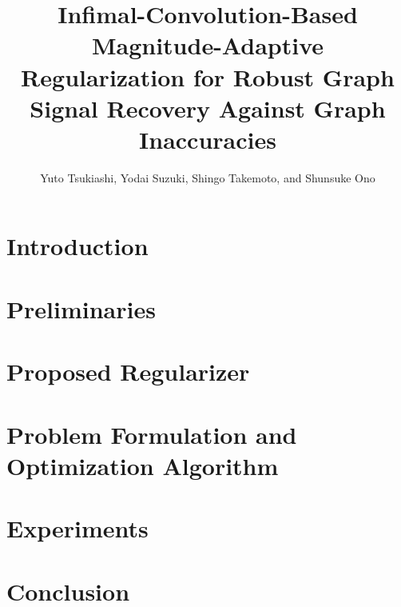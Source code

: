 \documentclass[journal]{IEEEtran}
\begin{document}
\title{Infimal-Convolution-Based Magnitude-Adaptive Regularization for Robust Graph Signal Recovery Against Graph Inaccuracies}
\author{Yuto Tsukiashi, Yodai Suzuki, Shingo Takemoto, and Shunsuke Ono}

\maketitle

\begin{abstract}
    
\end{abstract}

\begin{IEEEkeywords}
    
\end{IEEEkeywords}

\section{Introduction}
    

\section{Preliminaries}
\label{sec:preliminaries}
    

\section{Proposed Regularizer}
    

\section{Problem Formulation and Optimization Algorithm}
    \label{sec:optimization}
    
    
\section{Experiments}
    

\section{Conclusion}
    



\end{document}
